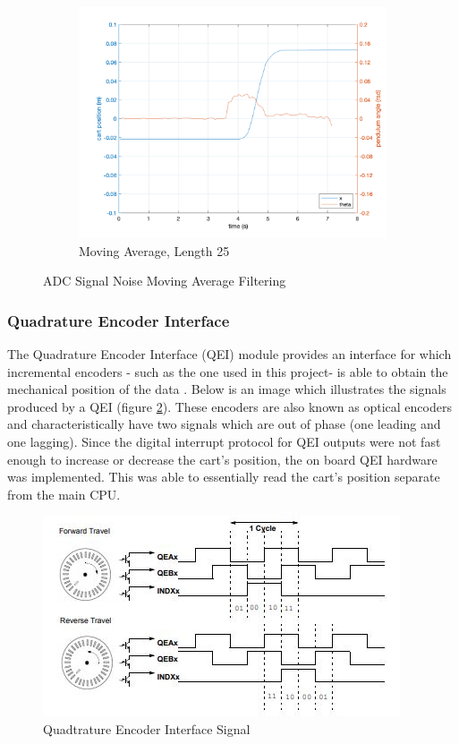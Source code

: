 \documentclass[12pt]{article}
\begin{document}
\begin{figure}[H]
\begin{subfigure}{.6\textwidth}
      \includegraphics[width=1\linewidth]{figures/movAvg25.png}
      \caption{Moving Average, Length 25}
    \end{subfigure}
    \caption{ADC Signal Noise Moving Average Filtering}
    \label{fig:filter}
\end{figure}


\subsubsection{Quadrature Encoder Interface}
The Quadrature Encoder Interface (QEI) module provides an interface for which incremental encoders - such as the one used in this project- is able to obtain the mechanical position of the data \cite{qei}. Below is an image which illustrates the signals produced by a QEI (figure \ref{fig:qei}). These encoders are also known as optical encoders and characteristically have two signals which are out of phase (one leading and one lagging). Since the digital interrupt protocol for QEI outputs were not fast enough to increase or decrease the cart's position, the on board QEI hardware was implemented. This was able to essentially read the cart's position separate from the main CPU. 

\begin{figure}[H]
    \centering
    \includegraphics[width=.7\linewidth]{figures/qei.JPG}
    \caption{Quadtrature Encoder Interface Signal}
    \label{fig:qei}
\end{figure}
\end{document}
